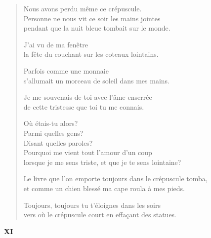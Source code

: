 \documentclass[11pt,a4paper]{book}
\begin{document}
\begin{verse}
  Nous avons perdu même ce crépuscule. \\
  Personne ne nous vit ce soir les mains jointes \\
  pendant que la nuit bleue tombait sur le monde.

  J'ai vu de ma fenêtre \\
  la fête du couchant sur les coteaux lointains.

  Parfois comme une monnaie \\
  s'allumait un morceau de soleil dans mes mains.

  Je me souvenais de toi avec l'âme enserrée \\
  de cette tristesse que toi tu me connais.

  Où étais-tu alors? \\
  Parmi quelles gens? \\
  Disant quelles paroles? \\
  Pourquoi me vient tout l'amour d'un coup \\
  lorsque je me sens triste, et que je te sens lointaine?

  Le livre que l'on emporte toujours dans le crépuscule tomba, \\
  et comme un chien blessé ma cape roula à mes pieds.

  Toujours, toujours tu t'éloignes dans les soirs \\
  vers où le crépuscule court en effaçant des statues.
\end{verse}

\newpage


\begin{center} \textbf{XI} \end{center}

\bigskip
\end{document}
